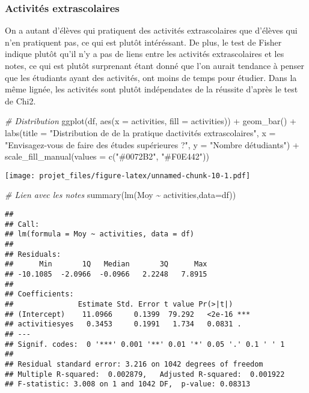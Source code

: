 \documentclass[
]{article}
\newenvironment{Shaded}{\begin{snugshade}}{\end{snugshade}}
\newcommand{\AttributeTok}[1]{\textcolor[rgb]{0.77,0.63,0.00}{#1}}
\newcommand{\CommentTok}[1]{\textcolor[rgb]{0.56,0.35,0.01}{\textit{#1}}}
\newcommand{\FunctionTok}[1]{\textcolor[rgb]{0.00,0.00,0.00}{#1}}
\newcommand{\NormalTok}[1]{#1}
\newcommand{\SpecialCharTok}[1]{\textcolor[rgb]{0.00,0.00,0.00}{#1}}
\newcommand{\StringTok}[1]{\textcolor[rgb]{0.31,0.60,0.02}{#1}}
\begin{document}
\hypertarget{activituxe9s-extrascolaires}{%
\subsubsection{Activités
extrascolaires}\label{activituxe9s-extrascolaires}}

On a autant d'élèves qui pratiquent des activités extrascolaires que
d'élèves qui n'en pratiquent pas, ce qui est plutôt intéréssant. De
plus, le test de Fisher indique plutôt qu'il n'y a pas de liens entre
les activités extrascolaires et les notes, ce qui est plutôt surprenant
étant donné que l'on aurait tendance à penser que les étudiants ayant
des activités, ont moins de temps pour étudier. Dans la même lignée, les
activités sont plutôt indépendates de la réussite d'après le test de
Chi2.

\begin{Shaded}
\begin{Highlighting}[]
\CommentTok{\# Distribution}
\FunctionTok{ggplot}\NormalTok{(df, }\FunctionTok{aes}\NormalTok{(}\AttributeTok{x =}\NormalTok{ activities, }\AttributeTok{fill =}\NormalTok{ activities)) }\SpecialCharTok{+}
  \FunctionTok{geom\_bar}\NormalTok{() }\SpecialCharTok{+}
  \FunctionTok{labs}\NormalTok{(}\AttributeTok{title =} \StringTok{"Distribution de de la pratique d\textquotesingle{}activités extrascolaires"}\NormalTok{,}
       \AttributeTok{x =} \StringTok{"Envisagez{-}vous de faire des études supérieures ?"}\NormalTok{, }
       \AttributeTok{y =} \StringTok{"Nombre d\textquotesingle{}étudiants"}\NormalTok{) }\SpecialCharTok{+}
  \FunctionTok{scale\_fill\_manual}\NormalTok{(}\AttributeTok{values =} \FunctionTok{c}\NormalTok{(}\StringTok{"\#0072B2"}\NormalTok{, }\StringTok{"\#F0E442"}\NormalTok{))}
\end{Highlighting}
\end{Shaded}

\texttt{[image: projet\_files/figure-latex/unnamed-chunk-10-1.pdf]}

\begin{Shaded}
\begin{Highlighting}[]
\CommentTok{\# Lien avec les notes}
\FunctionTok{summary}\NormalTok{(}\FunctionTok{lm}\NormalTok{(Moy }\SpecialCharTok{\textasciitilde{}}\NormalTok{ activities,}\AttributeTok{data=}\NormalTok{df))}
\end{Highlighting}
\end{Shaded}

\begin{verbatim}
## 
## Call:
## lm(formula = Moy ~ activities, data = df)
## 
## Residuals:
##      Min       1Q   Median       3Q      Max 
## -10.1085  -2.0966  -0.0966   2.2248   7.8915 
## 
## Coefficients:
##               Estimate Std. Error t value Pr(>|t|)    
## (Intercept)    11.0966     0.1399  79.292   <2e-16 ***
## activitiesyes   0.3453     0.1991   1.734   0.0831 .  
## ---
## Signif. codes:  0 '***' 0.001 '**' 0.01 '*' 0.05 '.' 0.1 ' ' 1
## 
## Residual standard error: 3.216 on 1042 degrees of freedom
## Multiple R-squared:  0.002879,   Adjusted R-squared:  0.001922 
## F-statistic: 3.008 on 1 and 1042 DF,  p-value: 0.08313
\end{verbatim}
\end{document}

